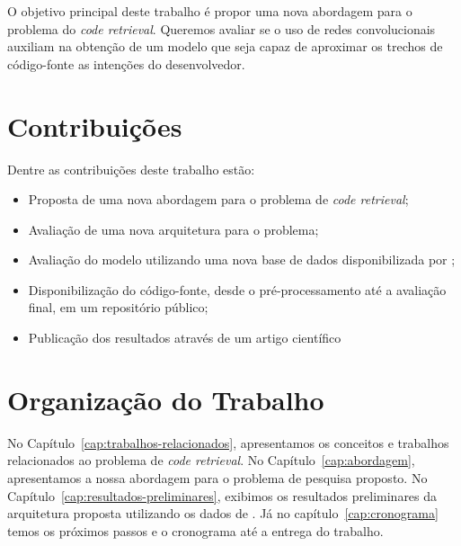 O objetivo principal deste trabalho é propor uma nova abordagem para o problema do \textit{code retrieval}. Queremos avaliar se o uso de redes convolucionais auxiliam na obtenção de um modelo que seja capaz de aproximar os trechos de código-fonte as intenções do desenvolvedor.

\section{Contribuições}
\label{sec:contribucoes}

Dentre as contribuições deste trabalho estão:

\begin{itemize}
\item Proposta de uma nova abordagem para o problema de \textit{code retrieval};
\item Avaliação de uma nova arquitetura para o problema;
\item Avaliação do modelo utilizando uma nova base de dados disponibilizada por \cite{yao-2018};
\item Disponibilização do código-fonte, desde o pré-processamento até a avaliação final, em um repositório público;
\item Publicação dos resultados através de um artigo científico
\end{itemize}

\section{Organização do Trabalho}
\label{sec:organizacao_trabalho}

No Capítulo~\ref{cap:trabalhos-relacionados}, apresentamos os conceitos e trabalhos relacionados ao problema de \textit{code retrieval}. No Capítulo~\ref{cap:abordagem}, apresentamos a nossa abordagem para o problema de pesquisa proposto. No Capítulo~\ref{cap:resultados-preliminares}, exibimos os resultados preliminares da arquitetura proposta utilizando os dados de \cite{yao-2018}. Já no capítulo~\ref{cap:cronograma} temos os próximos passos e o cronograma até a entrega do trabalho.